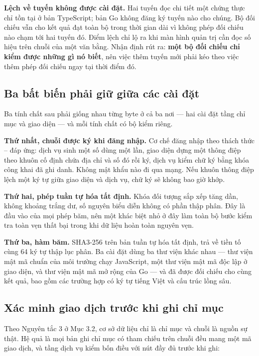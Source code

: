 \textbf{Lệch về tuyến không được cài đặt.} Hai tuyến đọc chi tiết một chứng thực chỉ tồn tại ở bản TypeScript; bản Go không đăng ký tuyến nào cho chúng. Bộ đối chiếu vẫn cho kết quả đạt toàn bộ trong thời gian dài vì không phép đối chiếu nào chạm tới hai tuyến đó. Điểm lệch chỉ lộ ra khi màn hình quản trị cần đọc số hiệu trên chuỗi của một văn bằng. Nhận định rút ra: \textbf{một bộ đối chiếu chỉ kiểm được những gì nó biết}, nên việc thêm tuyến mới phải kéo theo việc thêm phép đối chiếu ngay tại thời điểm đó.

\subsection{Ba bất biến phải giữ giữa các cài đặt}

Ba tính chất sau phải giống nhau từng byte ở cả ba nơi --- hai cài đặt tầng chỉ mục và giao diện --- và mỗi tính chất có bộ kiểm riêng.

\textbf{Thứ nhất, chuỗi được ký khi đăng nhập.} Cơ chế đăng nhập theo thách thức -- đáp ứng: dịch vụ sinh một số dùng một lần, giao diện dựng một thông điệp theo khuôn cố định chứa địa chỉ và số đó rồi ký, dịch vụ kiểm chữ ký bằng khóa công khai đã ghi danh. Không mật khẩu nào đi qua mạng. Nếu khuôn thông điệp lệch một ký tự giữa giao diện và dịch vụ, chữ ký sẽ không bao giờ khớp.

\textbf{Thứ hai, phép tuần tự hóa tất định.} Khóa đối tượng sắp xếp tăng dần, không khoảng trắng dư, số nguyên biểu diễn không có phần thập phân. Đây là đầu vào của mọi phép băm, nên một khác biệt nhỏ ở đây làm toàn bộ bước kiểm tra toàn vẹn thất bại trong khi dữ liệu hoàn toàn nguyên vẹn.

\textbf{Thứ ba, hàm băm.} SHA3-256 trên bản tuần tự hóa tất định, trả về tiền tố  cùng 64 ký tự thập lục phân. Ba cài đặt dùng ba thư viện khác nhau --- thư viện mật mã chuẩn của môi trường chạy JavaScript, một thư viện mật mã độc lập ở giao diện, và thư viện mật mã mở rộng của Go --- và đã được đối chiếu cho cùng kết quả, bao gồm các trường hợp có ký tự tiếng Việt và cấu trúc lồng sâu.

\subsection{Xác minh giao dịch trước khi ghi chỉ mục}

Theo Nguyên tắc 3 ở Mục 3.2, cơ sở dữ liệu chỉ là chỉ mục và chuỗi là nguồn sự thật. Hệ quả là mọi bản ghi chỉ mục có tham chiếu trên chuỗi đều mang một mã giao dịch, và tầng dịch vụ kiểm bốn điều với nút đầy đủ trước khi ghi:

